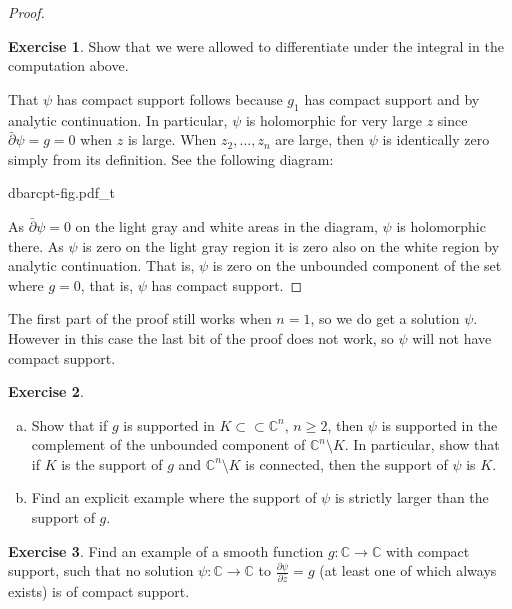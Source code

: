 \documentclass[12pt,openany]{book}
\newcommand{\C}{{\mathbb{C}}}
\theoremstyle{plain}
\theoremstyle{remark}
\theoremstyle{definition}
\newenvironment{exbox}{%
    \def\FrameCommand{\vrule width 1pt \relax\hspace {10pt}}%
    \MakeFramed {\advance \hsize -\width \FrameRestore }%
}{%
    \endMakeFramed
}
\newenvironment{exparts}{%
    \leavevmode\begin{enumerate}[a),noitemsep,topsep=0pt,parsep=0pt,partopsep=0pt]
}{%
    \end{enumerate}
}
\newenvironment{myfig}{%
    \begin{center}
}{%
    \end{center}
}
\theoremstyle{exercise}
\newtheorem{exercise}{Exercise}[section]
\theoremstyle{example}
\begin{document}
\begin{proof}
\begin{exbox}
\begin{exercise}
Show that we were allowed to differentiate under the integral in the
computation above.
\end{exercise}
\end{exbox}

That $\psi$ has compact support follows because $g_1$ has compact
support and by analytic continuation.  In particular, $\psi$ is
holomorphic for very large $z$ since $\bar{\partial} \psi = g = 0$ when $z$
is large.  When $z_2,\ldots,z_n$ are large, then $\psi$ is identically zero
simply from its definition.  See the following diagram:

\begin{myfig}
{dbarcpt-fig.pdf_t}
\end{myfig}

As $\bar{\partial} \psi = 0$ on the light gray and white areas in the
diagram, $\psi$ is holomorphic there. As $\psi$ is zero on the light
gray region it is zero also on the white region by analytic continuation.
That is, $\psi$ is zero on the unbounded component of the set where $g=0$,
that is, $\psi$ has compact support.
\end{proof}

The first part of the proof still works when $n=1$, so we do get a solution
$\psi$.  However in this case the last bit of the proof does not work, so
$\psi$ will not have compact support.

\begin{exbox}
\begin{exercise} \label{exercise:supportofpsi}
\begin{exparts}
\item
Show that if $g$ is supported in $K \subset \subset \C^n$, $n \geq 2$,
then $\psi$ is supported in the complement of the unbounded component
of $\C^n \setminus K$.  In particular, show that if $K$ is the support of
$g$ and $\C^n \setminus K$ is connected, then the support of
$\psi$ is $K$.
\item
Find an explicit example where the support of $\psi$ is strictly larger
than the support of $g$.
\end{exparts}
\end{exercise}

\begin{exercise}
Find an example of a smooth function $g \colon \C \to \C$ with compact
support, such that no solution $\psi \colon \C \to \C$ to
$\frac{\partial \psi}{\partial \bar{z}} = g$ (at least one of which always exists) is
of compact support.
\end{exercise}
\end{exbox}
\end{document}
